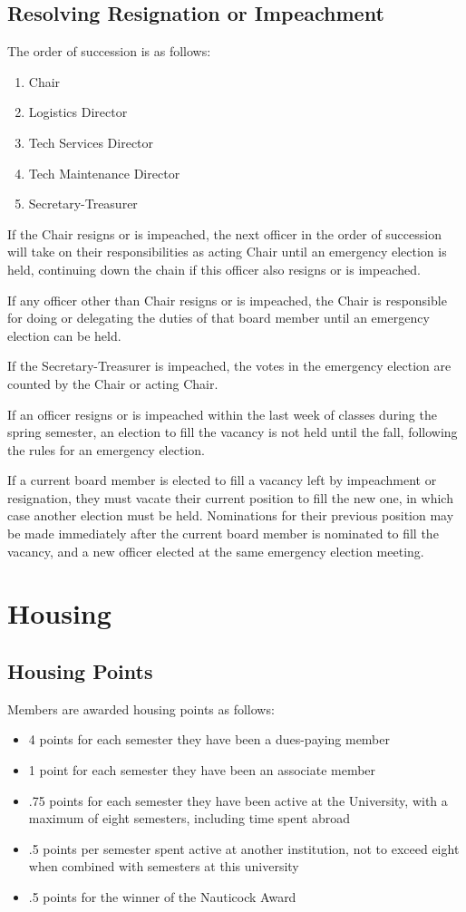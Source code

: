 \documentclass[12pt]{amsart}
\begin{document}
	\subsection {Resolving Resignation or Impeachment}
The order of succession is as follows:
\begin{enumerate}
	\item Chair
	\item Logistics Director
	\item Tech Services Director
	\item Tech Maintenance Director
	\item Secretary-Treasurer
\end{enumerate}

If the Chair resigns or is impeached, the next officer in the order of succession will take on their responsibilities as acting Chair until an emergency election is held, continuing down the chain if this officer also resigns or is impeached.

If any officer other than Chair resigns or is impeached, the Chair is responsible for doing or delegating the duties of that board member until an emergency election can be held.

If the Secretary-Treasurer is impeached, the votes in the emergency election are counted by the Chair or acting Chair.

If an officer resigns or is impeached within the last week of classes during the spring semester, an election to fill the vacancy is not held until the fall, following the rules for an emergency election.

If a current board member is elected to fill a vacancy left by impeachment or resignation, they must vacate their current position to fill the new one, in which case another election must be held. Nominations for their previous position may be made immediately after the current board member is nominated to fill the vacancy, and a new officer elected at the same emergency election meeting.
\section {Housing}
	\subsection {Housing Points}
	Members are awarded housing points as follows:
\begin{itemize}
	\item 4 points for each semester they have been a dues-paying member
	\item 1 point for each semester they have been an associate member
	\item .75 points for each semester they have been active at the University, with a maximum of eight semesters, including time spent abroad
	\item .5 points per semester spent active at another institution, not to exceed eight when combined with semesters at this university
	\item .5 points for the winner of the Nauticock Award
\end{itemize}
\end{document}
